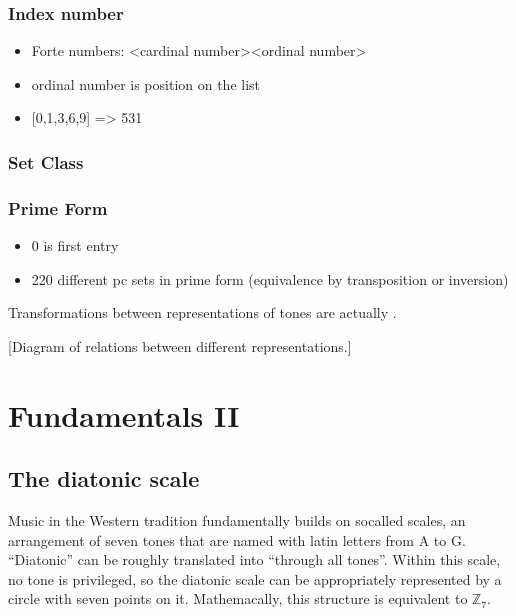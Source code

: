 \documentclass[letterpaper,10pt,english]{sphinxmanual}
\begin{document}
\subsection{Index number}
\label{\detokenize{2_fundamentals1:index-number}}\begin{itemize}
\item {} 
Forte numbers: \textless{}cardinal number\textgreater{}\sphinxhyphen{}\textless{}ordinal number\textgreater{}

\item {} 
ordinal number is position on the list

\item {} 
{[}0,1,3,6,9{]} =\textgreater{} 5\sphinxhyphen{}31

\end{itemize}


\subsection{Set Class}
\label{\detokenize{2_fundamentals1:set-class}}

\subsection{Prime Form}
\label{\detokenize{2_fundamentals1:prime-form}}\begin{itemize}
\item {} 
0 is first entry

\item {} 
220 different pc sets in prime form (equivalence by transposition or inversion)

\end{itemize}

Transformations between representations of tones are actually .

{[}Diagram of relations between different representations.{]}


\chapter{Fundamentals II}
\label{\detokenize{3_fundamentals2:fundamentals-ii}}\label{\detokenize{3_fundamentals2::doc}}

\section{The diatonic scale}
\label{\detokenize{3_fundamentals2:the-diatonic-scale}}
Music in the Western tradition fundamentally builds on
so\sphinxhyphen{}called  scales, an arrangement of seven tones
that are named with latin letters from A to G. “Diatonic” can
be roughly translated into “through all tones”. Within this scale,
no tone is privileged, so the diatonic scale can be appropriately
represented by a circle with seven points on it. Mathemacally,
this structure is equivalent to \(\mathbb{Z}_7\).
\end{document}
